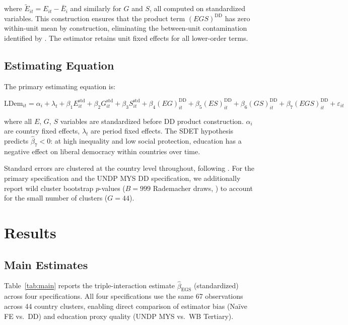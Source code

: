 \documentclass[11pt,letterpaper]{article}
\begin{document}
where $\widetilde{E}_{it} = E_{it} - \bar{E}_i$ and similarly for $G$ and $S$, all computed on
standardized variables. This construction ensures that the product term $(EGS)^\text{DD}$ has zero
within-unit mean by construction, eliminating the between-unit contamination identified by
\citet{Giesselmann2022}. The estimator retains unit fixed effects for all lower-order terms.

\subsection{Estimating Equation}

The primary estimating equation is:

\begin{equation}
  \text{LDem}_{it} = \alpha_i + \lambda_t + \beta_1 E^\text{std}_{it} + \beta_2 G^\text{std}_{it}
  + \beta_3 S^\text{std}_{it} + \beta_4 (EG)^\text{DD}_{it} + \beta_5 (ES)^\text{DD}_{it}
  + \beta_6 (GS)^\text{DD}_{it} + \beta_7 (EGS)^\text{DD}_{it} + \varepsilon_{it}
  \label{eq:main}
\end{equation}

where all $E$, $G$, $S$ variables are standardized before DD product construction. $\alpha_i$ are
country fixed effects, $\lambda_t$ are period fixed effects. The SDET hypothesis predicts
$\hat{\beta}_7 < 0$: at high inequality and low social protection, education has a negative effect
on liberal democracy within countries over time.

Standard errors are clustered at the country level throughout, following \citet{Cameron2015}. For
the primary specification and the UNDP MYS DD specification, we additionally report wild cluster
bootstrap $p$-values ($B = 999$ Rademacher draws, \citealt{Cameron2008}) to account for the small
number of clusters ($G = 44$).

\section{Results}
\label{sec:results}

\subsection{Main Estimates}

Table~\ref{tab:main} reports the triple-interaction estimate $\hat{\beta}_\text{EGS}$
(standardized) across four specifications. All four specifications use the same 67 observations
across 44 country clusters, enabling direct comparison of estimator bias (Na\"{i}ve FE vs.\ DD)
and education proxy quality (UNDP MYS vs.\ WB Tertiary).
\end{document}

